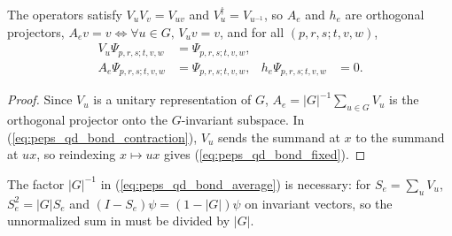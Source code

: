 \begin{lemma}
    \label{thm:peps_quantum_double_bond_fixed}
    \leanok
    The operators satisfy $V_uV_v=V_{uv}$ and $V_u^\dagger=V_{u^{-1}}$, so $A_e$ and $h_e$ are orthogonal projectors, $A_ev=v\iff\forall u\in G,\,V_uv=v$, and for all $(p,r,s;t,v,w)$,
    \begin{align}
        V_u\Psi_{p,r,s;t,v,w} & =\Psi_{p,r,s;t,v,w},        \\
        A_e\Psi_{p,r,s;t,v,w} & =\Psi_{p,r,s;t,v,w},
                              & h_e\Psi_{p,r,s;t,v,w} & =0.
        \label{eq:peps_qd_bond_fixed}
    \end{align}
\end{lemma}
\begin{proof}\leanok
    Since $V_u$ is a unitary representation of $G$, $A_e=|G|^{-1}\sum_{u\in G}V_u$ is the orthogonal projector onto the $G$-invariant subspace. In (\ref{eq:peps_qd_bond_contraction}), $V_u$ sends the summand at $x$ to the summand at $ux$, so reindexing $x\mapsto ux$ gives (\ref{eq:peps_qd_bond_fixed}).
\end{proof}

The factor $|G|^{-1}$ in (\ref{eq:peps_qd_bond_average}) is necessary: for $S_e=\sum_uV_u$, $S_e^2=|G|S_e$ and $(I-S_e)\psi=(1-|G|)\psi$ on invariant vectors, so the unnormalized sum in \cite[Section~7]{Schuch2010PEPS} must be divided by $|G|$.

